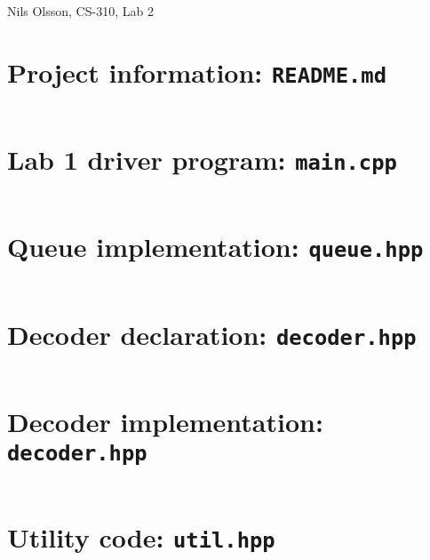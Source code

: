 \documentclass{article}
\begin{document}
\begin{center}
    Nils Olsson, CS-310, Lab 2
\end{center}
\hrulefill{}

\section*{Project information: \texttt{README.md}}
\inputminted{md}{README.md}

\section*{Lab 1 driver program: \texttt{main.cpp}}
\inputminted{cpp}{src/main.cpp}

\section*{Queue implementation: \texttt{queue.hpp}}
\inputminted{cpp}{src/queue.hpp}

\section*{Decoder declaration: \texttt{decoder.hpp}}
\inputminted{cpp}{src/decoder.hpp}

\section*{Decoder implementation: \texttt{decoder.hpp}}
\inputminted{cpp}{src/decoder.cpp}

\section*{Utility code: \texttt{util.hpp}}
\inputminted{cpp}{src/util.hpp}
\end{document}
